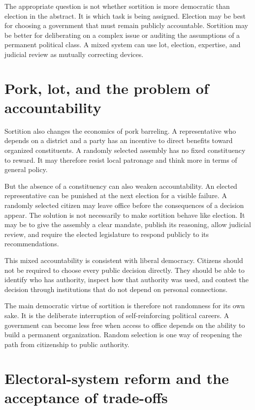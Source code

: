 ﻿\documentclass[12pt,a4paper]{book}
\begin{document}
The appropriate question is not whether sortition is more democratic than
election in the abstract.  It is which task is being assigned.  Election may
be best for choosing a government that must remain publicly accountable.
Sortition may be better for deliberating on a complex issue or auditing the
assumptions of a permanent political class.  A mixed system can use lot,
election, expertise, and judicial review as mutually correcting devices.

\section{Pork, lot, and the problem of accountability}

Sortition also changes the economics of pork barreling.  A representative
who depends on a district and a party has an incentive to direct benefits
toward organized constituents.  A randomly selected assembly has no fixed
constituency to reward.  It may therefore resist local patronage and think
more in terms of general policy.

But the absence of a constituency can also weaken accountability.  An elected
representative can be punished at the next election for a visible failure.
A randomly selected citizen may leave office before the consequences of a
decision appear.  The solution is not necessarily to make sortition behave
like election.  It may be to give the assembly a clear mandate, publish its
reasoning, allow judicial review, and require the elected legislature to
respond publicly to its recommendations.

This mixed accountability is consistent with liberal democracy.  Citizens
should not be required to choose every public decision directly.  They should
be able to identify who has authority, inspect how that authority was used,
and contest the decision through institutions that do not depend on personal
connections.

The main democratic virtue of sortition is therefore not randomness for its
own sake.  It is the deliberate interruption of self-reinforcing political
careers.  A government can become less free when access to office depends on
the ability to build a permanent organization.  Random selection is one way
of reopening the path from citizenship to public authority.

\section{Electoral-system reform and the acceptance of trade-offs}
\end{document}
